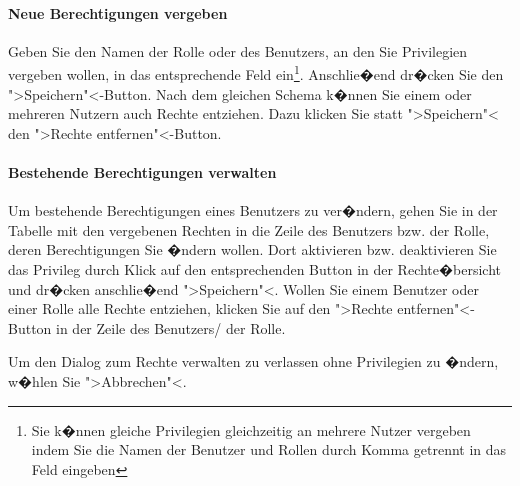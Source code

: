 \paragraph{Neue Berechtigungen vergeben}
Geben Sie den Namen der Rolle oder des Benutzers, an den Sie Privilegien vergeben wollen, in das entsprechende Feld ein\footnote{Sie k�nnen gleiche Privilegien gleichzeitig an mehrere Nutzer vergeben indem Sie die Namen der Benutzer und Rollen durch Komma getrennt in das Feld eingeben}. Anschlie�end dr�cken Sie den ">Speichern"<-Button. Nach dem gleichen Schema k�nnen Sie einem oder mehreren Nutzern auch Rechte entziehen. Dazu klicken Sie statt ">Speichern"< den ">Rechte entfernen"<-Button.

\paragraph{Bestehende Berechtigungen verwalten}


Um bestehende Berechtigungen eines Benutzers zu ver�ndern, gehen Sie in der Tabelle mit den vergebenen Rechten in die Zeile des Benutzers bzw. der Rolle, deren Berechtigungen Sie �ndern wollen. Dort aktivieren bzw. deaktivieren Sie das Privileg durch Klick auf den entsprechenden Button in der Rechte�bersicht und dr�cken anschlie�end ">Speichern"<. Wollen Sie einem Benutzer oder einer Rolle alle Rechte entziehen, klicken Sie auf den ">Rechte entfernen"<-Button in der Zeile des Benutzers/ der Rolle.

Um den Dialog zum Rechte verwalten zu verlassen ohne Privilegien zu �ndern, w�hlen Sie ">Abbrechen"<.

